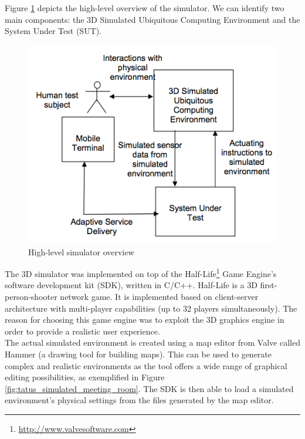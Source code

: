 Figure \ref{fig:tatus_overview} depicts the high-level overview of the simulator. We can identify two main components: the 3D Simulated Ubiquitous Computing Environment and the System Under Test (SUT).\\

\begin{figure}[H]
	\centering
	\includegraphics[width=\linewidth]{gfx/Chapter2/tatus_system_overview}
	\caption{High-level simulator overview}
	\label{fig:tatus_overview}
\end{figure}

The 3D simulator was implemented on top of the Half-Life\footnote{\url{http://www.valvesoftware.com}} Game Engine's software development kit (SDK), written in C/C++. Half-Life is a 3D first-person-shooter network game. It is implemented based on client-server architecture with multi-player capabilities (up to 32 players simultaneously). The reason for choosing this game engine was to exploit the 3D graphics engine in order to provide a realistic user experience.\\

The actual simulated environment is created using a map editor from Valve called Hammer (a drawing tool for building maps). This can be used to generate complex and realistic environments as the tool offers a wide range of graphical editing possibilities, as exemplified in Figure \ref{fig:tatus_simulated_meeting_room}. The SDK is then able to load a simulated environment's physical settings from the files generated by the map editor.\\

